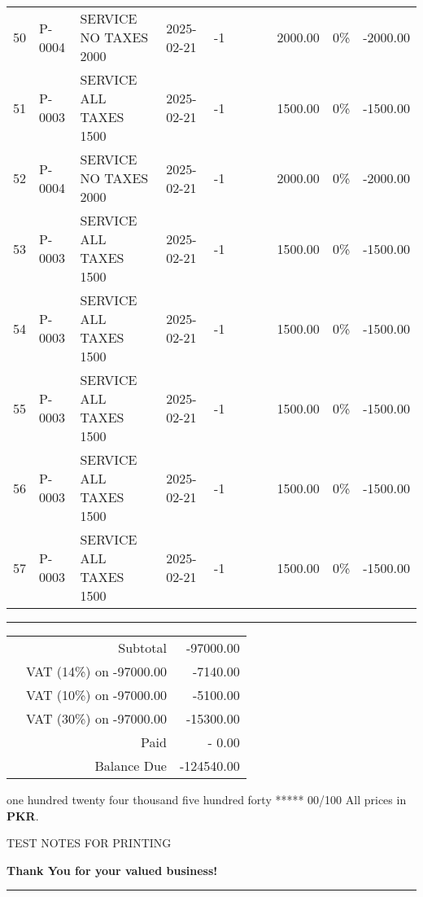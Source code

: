 \documentclass{scrartcl}
\begin{document}
\begin{tabularx}{\textwidth}{@{}rlXlrlllrrr@{}}
  50 & P-0004 & SERVICE NO TAXES 2000 & 2025-02-21 &
  -1 &  &  &  & 2000.00 & 0\% & -2000.00 \\
  51 & P-0003 & SERVICE ALL TAXES 1500 & 2025-02-21 &
  -1 &  &  &  & 1500.00 & 0\% & -1500.00 \\
  52 & P-0004 & SERVICE NO TAXES 2000 & 2025-02-21 &
  -1 &  &  &  & 2000.00 & 0\% & -2000.00 \\
  53 & P-0003 & SERVICE ALL TAXES 1500 & 2025-02-21 &
  -1 &  &  &  & 1500.00 & 0\% & -1500.00 \\
  54 & P-0003 & SERVICE ALL TAXES 1500 & 2025-02-21 &
  -1 &  &  &  & 1500.00 & 0\% & -1500.00 \\
  55 & P-0003 & SERVICE ALL TAXES 1500 & 2025-02-21 &
  -1 &  &  &  & 1500.00 & 0\% & -1500.00 \\
  56 & P-0003 & SERVICE ALL TAXES 1500 & 2025-02-21 &
  -1 &  &  &  & 1500.00 & 0\% & -1500.00 \\
  57 & P-0003 & SERVICE ALL TAXES 1500 & 2025-02-21 &
  -1 &  &  &  & 1500.00 & 0\% & -1500.00 \\
\end{tabularx}


\parbox{\textwidth}{
\rule{\textwidth}{2pt}

\vspace{0.2cm}

\hfill
\begin{tabularx}{7cm}{Xr@{\hspace{1cm}}r@{}}
  & Subtotal & -97000.00 \\
  & VAT (14\%) on -97000.00 & -7140.00 \\
  & VAT (10\%) on -97000.00 & -5100.00 \\
  & VAT (30\%) on -97000.00 & -15300.00 \\
  & Paid & - 0.00 \\
  \hline
  & Balance Due & -124540.00
\end{tabularx}

\vspace{0.3cm}

one hundred twenty four thousand five hundred forty ***** 00/100
\hfill
All prices in \textbf{PKR}.

\vspace{12pt}

TEST NOTES FOR PRINTING
}

\vfill


\vspace{1cm}

\centerline{\textbf{Thank You for your valued business!}}

\rule{\textwidth}{0.5pt}

\usebox{\ftr}
\end{document}
